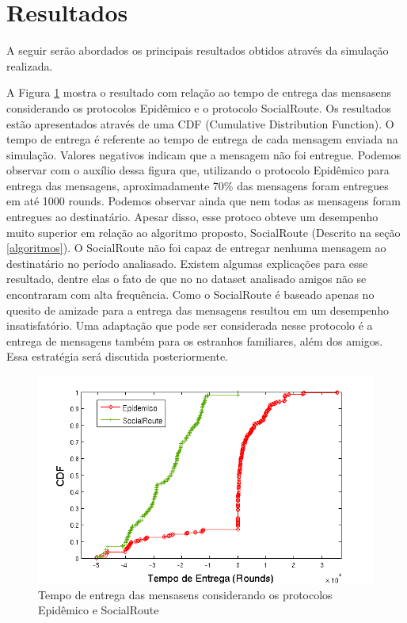 \section{Resultados}\label{sec:figs}

A seguir serão abordados os principais resultados obtidos através da
simulação realizada.

A Figura \ref{fig:Epidemico_SocialRoute} mostra o resultado com relação
ao tempo de entrega das mensasens considerando os protocolos Epidêmico e
o protocolo SocialRoute. Os resultados estão apresentados através de uma
CDF (Cumulative Distribution Function). O tempo de entrega é referente
ao tempo de entrega de cada mensagem enviada na simulação. Valores
negativos indicam que a mensagem não foi entregue. Podemos observar com
o auxílio dessa figura que, utilizando o protocolo Epidêmico para
entrega das mensagens, aproximadamente 70\% das mensagens foram
entregues em até 1000 rounds. Podemos observar ainda que nem todas as
mensagens foram entregues ao destinatário. Apesar disso, esse protoco
obteve um desempenho muito superior em relação ao algoritmo proposto,
SocialRoute (Descrito na seção \ref{algoritmos}). O SocialRoute não foi
capaz de entregar nenhuma mensagem ao destinatário no período
analiasado. Existem algumas explicações para esse resultado, dentre elas
o fato de que no no dataset analisado amigos não se encontraram com alta
frequência. Como o SocialRoute é baseado apenas no quesito de amizade
para a entrega das mensagens resultou em um desempenho insatisfatório.
Uma adaptação que pode ser considerada nesse protocolo é a entrega de
mensagens também para os estranhos familiares, além dos amigos. Essa
estratégia será discutida posteriormente.

\begin{figure}[ht]
\centering
\includegraphics[width=.7\textwidth]{img/tempo_epidemico_socialRoute.png}
\caption{Tempo de entrega das mensasens considerando os protocolos Epidêmico e SocialRoute}
\label{fig:Epidemico_SocialRoute}
\end{figure}

